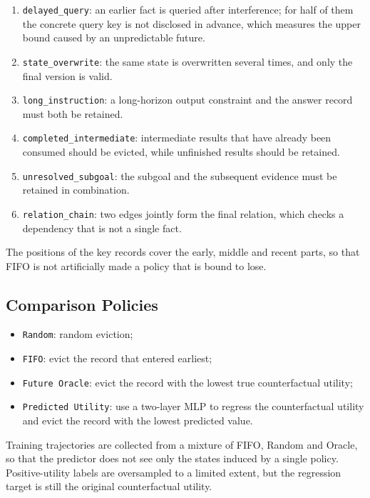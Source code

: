 \begin{enumerate}
  \item \texttt{delayed\_query}: an earlier fact is queried after interference; for half of them the concrete query key is not disclosed in advance, which measures the upper bound caused by an unpredictable future.
  \item \texttt{state\_overwrite}: the same state is overwritten several times, and only the final version is valid.
  \item \texttt{long\_instruction}: a long-horizon output constraint and the answer record must both be retained.
  \item \texttt{completed\_intermediate}: intermediate results that have already been consumed should be evicted, while unfinished results should be retained.
  \item \texttt{unresolved\_subgoal}: the subgoal and the subsequent evidence must be retained in combination.
  \item \texttt{relation\_chain}: two edges jointly form the final relation, which checks a dependency that is not a single fact.
\end{enumerate}

The positions of the key records cover the early, middle and recent parts, so that FIFO is not artificially made a policy that is bound to lose.

\subsection{Comparison Policies}

\begin{itemize}
  \item \texttt{Random}: random eviction;
  \item \texttt{FIFO}: evict the record that entered earliest;
  \item \texttt{Future Oracle}: evict the record with the lowest true counterfactual utility;
  \item \texttt{Predicted Utility}: use a two-layer MLP to regress the counterfactual utility and evict the record with the lowest predicted value.
\end{itemize}

Training trajectories are collected from a mixture of FIFO, Random and Oracle, so that the predictor does not see only the states induced by a single policy. Positive-utility labels are oversampled to a limited extent, but the regression target is still the original counterfactual utility.

